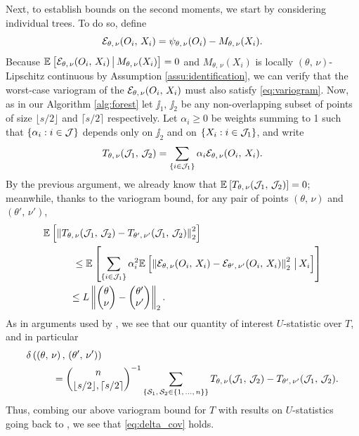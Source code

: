 \documentclass[aos]{imsart}
\theoremstyle{plain}
\theoremstyle{definition}
\theoremstyle{remark}
\begin{document}
\begin{CJK}{UTF8}{gbsn}
\begin{appendix}
Next, to establish bounds on the second moments, we start by considering individual
trees. To do so, define
$$ \mathcal{E}_{\theta, \, \nu}(O_i,\, X_i) = \psi_{\theta, \, \nu}(O_i) - M_{\theta, \, \nu}(X_i). $$
Because $\mathbb{E}_{}\left[\mathcal{E}_{\theta, \, \nu}(O_i,\, X_i) \,\big|\, M_{\theta, \, \nu}(X_i)\right] = 0$ and $M_{\theta, \, \nu}(X_i)$
is locally $(\theta, \, \nu)$-Lipschitz continuous by Assumption \ref{assu:identification}, we can verify
that the worst-case variogram of the $\mathcal{E}_{\theta, \, \nu}(O_i,\, X_i)$ must also satisfy \eqref{eq:variogram}.
Now, as in our Algorithm \ref{alg:forest}  let $\jj_1, \, \jj_2$ be any
non-overlapping subset of points of size $\lfloor s/2 \rfloor$ and $\lceil s/2 \rceil$ respectively.
Let $\alpha_i \geq 0$ be weights summing to 1 such that
$\left\{\alpha_i : i \in \mathcal{J}\right\}$ depends only on $\jj_2$ and on $\left\{X_i : i \in \mathcal{J}_1\right\}$, and write
$$ T_{\theta, \, \nu}(\mathcal{J}_1, \, \mathcal{J}_2) = \sum_{\left\{i \in \mathcal{J}_1\right\}} \alpha_i \mathcal{E}_{\theta, \, \nu}(O_i,\, X_i). $$
By the previous argument, we already know that $\mathbb{E}_{}\left[T_{\theta, \, \nu}(\mathcal{J}_1, \, \mathcal{J}_2)\right] = 0$;
meanwhile, thanks to the variogram bound, for any pair of points
$(\theta, \, \nu)$ and $(\theta', \, \nu')$,
\begin{equation}
\label{eq:tree_variogram}
\begin{split}
&\EE{\Norm{T_{\theta, \, \nu}(\jj_1, \, \jj_2) - T_{\theta', \, \nu'}(\jj_1, \, \jj_2)}_2^2} \\
&\ \ \ \ \ \ \ \ \ \leq \EE{\sum_{\cb{i \in \jj_1}} \alpha_i^2 \EE{\Norm{\ecal_{\theta, \, \nu}(O_i,\, X_i) - \ecal_{\theta', \, \nu'}(O_i,\, X_i)}_2^2 \cond X_i}}  \\
& \ \ \ \ \ \ \ \ \leq L \Norm{\begin{pmatrix} \theta \\ \nu \end{pmatrix} -  \begin{pmatrix} \theta' \\ \nu' \end{pmatrix}}_2.
\end{split}
\end{equation}
As in arguments used by \citet{wager2015estimation}, we see that
our quantity of interest $U$-statistic over $T$, and in particular
\begin{align*}
&\delta\p{\p{\theta, \, \nu}, \, \p{\theta', \, \nu'}} \\
&\ \ \ \ \ \ \ \ = \binom{n}{\lfloor s/2 \rfloor, \lceil s/2 \rceil}^{-1} \sum_{\cb{\set_1, \, \set_2 \in \cb{1, \, ..., \, n}}} T_{\theta, \, \nu}(\jj_1, \, \jj_2) - T_{\theta', \, \nu'}(\jj_1, \, \jj_2). 
\end{align*}
Thus, combing our above variogram bound for $T$ with results on $U$-statistics
going back to \citet{hoeffding1948class}, we see that \eqref{eq:delta_cov} holds.


\end{appendix}
\end{CJK}
\end{document}
